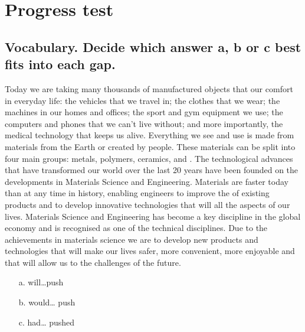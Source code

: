 \section{Progress test}

\subsection*{Vocabulary. Decide which answer a, b or c best fits into each gap.}
Today we are taking \underline{\hspace{2cm}} many thousands of manufactured objects that \underline{\hspace{2cm}} our comfort in everyday life: the vehicles that we travel in; the clothes that we wear; the machines in our homes and offices; the sport and gym equipment we use; the computers and phones that we can’t live without; and more importantly, the medical technology that keeps us alive. Everything we see and use is made from materials \underline{\hspace{2cm}} from the Earth or created by people. These materials can be split into four main groups: metals, polymers, ceramics, and \underline{\hspace{2cm}} . The technological advances that have transformed our world over the last 20 years have been founded on the developments in Materials Science and Engineering. Materials are \underline{\hspace{2cm}} faster today than at any time in history, enabling engineers to improve the \underline{\hspace{2cm}} of existing products and to develop innovative technologies that will \underline{\hspace{2cm}} all the aspects of our lives. Materials Science and Engineering has become a key discipline in the \underline{\hspace{2cm}} global economy and is recognised as one of the technical disciplines. Due to the achievements in materials science we are \underline{\hspace{2cm}} to develop new products and technologies that will make our lives safer, more convenient, more enjoyable and that will allow us to \underline{\hspace{2cm}} the challenges of the future.

\begin{enumerate}
      \item[a.] will…push
      \item[b.] would… push
      \item[c.] had… pushed
\end{enumerate}

